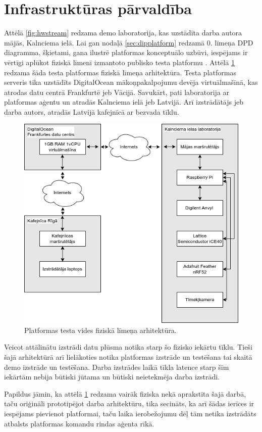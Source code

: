 \section{Infrastruktūras pārvaldība}
\label{sec:ops}

Attēlā \ref{fig:hwstream} redzama demo laboratorija, kas uzstādīta darba autora
mājās, Kalnciema ielā. Lai gan nodaļā \ref{sec:dipplatform} redzamā 0. līmeņa
DPD diagramma, šķietami, gana ilustrē platformas konceptuālo uzbūvi, iespējams
ir vērtīgi aplūkot fiziskā līmenī izmantoto publisko testa platformu
\cite{VeinbahsKrisjanisProduction}. Attēlā \ref{fig:production} redzama šāda
testa platformas fiziskā līmeņa arhitektūra. Testa platformas serveris tika
uzstādīts DigitalOcean mākoņpakalpojumu devēja virtuālmašīnā, kas atrodas datu
centrā Frankfurtē jeb Vācijā. Savukārt, pati laboratorija ar platformas aģentu
un  atradās Kalnciema ielā jeb Latvijā. Arī
 izstrādātājs jeb darba autors, atradās
Latvijā kafejnīcā ar bezvada tīklu.

\begin{figure}[H]
    \includegraphics[width=0.8\linewidth]{assets/production.drawio.png}
    \centering
    \caption{Platformas testa vides fiziskā līmeņa arhitektūra.}
    \label{fig:production}
\end{figure}

Veicot attālinātu  izstrādi datu plūsma
notika starp šo fizisko iekārtu tīklu. Tieši šajā arhitektūrā arī lielākoties
notika platformas izstrāde un testēšana tai skaitā demo
 izstrāde un testēšana. Darba izstrādes
laikā tīkla latence starp šīm iekārtām nebija būtiski jūtama un būtiski
neietekmēja darba izstrādi.

Papildus jāmin, ka attēlā \ref{fig:production} redzama vairāk fiziska
 nekā aprakstīta šajā darbā, taču oriģināli
prototipējot darba arhitektūru, tika secināts, ka arī šādas ierīces ir iespējams
pievienot platformai, taču laika ierobežojumu dēļ tām netika izstrādāts atbalsts
platformas komandu rindas aģenta rīkā. 
